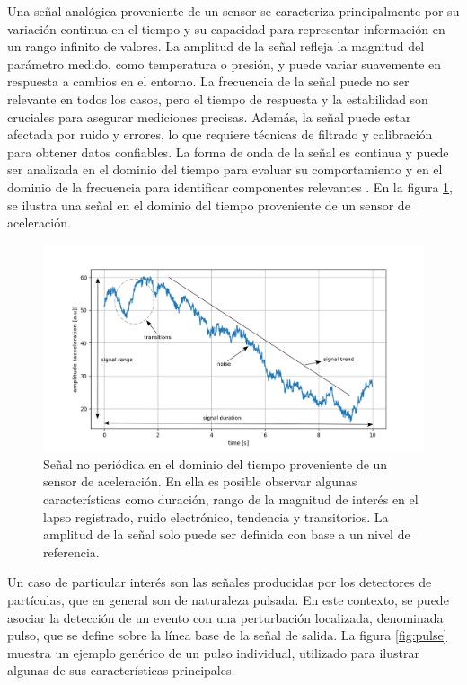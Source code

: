 \documentclass[]{book}
\begin{document}
\noindent Una señal analógica proveniente de un sensor se caracteriza principalmente por su variación continua en el tiempo y su capacidad para representar información en un rango infinito de valores. La amplitud de la señal refleja la magnitud del parámetro medido, como temperatura o presión, y puede variar suavemente en respuesta a cambios en el entorno. La frecuencia de la señal puede no ser relevante en todos los casos, pero el tiempo de respuesta y la estabilidad son cruciales para asegurar mediciones precisas. Además, la señal puede estar afectada por ruido y errores, lo que requiere técnicas de filtrado y calibración para obtener datos confiables. La forma de onda de la señal es continua y puede ser analizada en el dominio del tiempo para evaluar su comportamiento y en el dominio de la frecuencia para identificar componentes relevantes \cite{sinclair2000sensors}. En la figura \ref{fig:generic_signal}, se ilustra una señal en el dominio del tiempo proveniente de un sensor de aceleración.\\

\begin{figure}[h]
    \centering
    \includegraphics[width=1.0\textwidth]{mysignal.png}
    \caption{Señal no periódica en el dominio del tiempo proveniente de un sensor de aceleración. En ella es posible observar algunas características como duración, rango de la magnitud de interés en el lapso registrado, ruido electrónico, tendencia y transitorios. La amplitud de la señal solo puede ser definida con base a un nivel de referencia.}
    \label{fig:generic_signal}

\end{figure}

\noindent Un caso de particular interés son las señales producidas por los detectores de partículas, que en general son de naturaleza pulsada. En este contexto, se puede asociar la detección de un evento con una perturbación localizada, denominada pulso, que se define sobre la línea base de la señal de salida. La figura \ref{fig:pulse} muestra un ejemplo genérico de un pulso individual, utilizado para ilustrar algunas de sus características principales.
\end{document}

